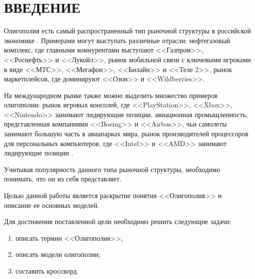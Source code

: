 \chapter*{ВВЕДЕНИЕ}

Олигополия есть самый распространенный тип рыночной структуры в российской экономике \cite{info_oly}. Примерами могут выступать различные отрасли: нефтегазовый комплекс, где главными комнурентами выступают <<Газпром>>, <<Роснефть>> и <<Лукойл>>, рынок мобильной связи с ключевыми игроками в виде <<МТС>>, <<Мегафон>>, <<Билайн>> и <<Теле 2>>, рынок маркетплейсов, где доминируют <<Озон>> и <<Wildberries>>.

На международном рынке также можно выделить множество примеров олигополии: рынок игровых консолей, где <<PlayStation>>, <<Xbox>>, <<Nintendo>> занимают лидирующие позиции, авиационная промыщленность, представленная компаниями <<Boeing>> и <<Airbus>>, чьи самолеты занимают большую часть в авиапарках мира, рынок производителей процессоров для персональных компьютеров, где <<Intel>> и <<AMD>> занимают лидирующие позиции \cite{info_oly2}.

Учитывая популярность данного типа рыночной структуры, необходимо понимать, что он из себя представляет.

Целью данной работы является раскрытие понятия <<Олигополия>> и описание ее основных моделей. 

Для достижения поставленной цели необходимо решить следующие задачи: 

\begin{enumerate}
	\item описать термин <<Олигополия>>;
	\item описать модели олигополии;
	\item составить кроссворд.
\end{enumerate}